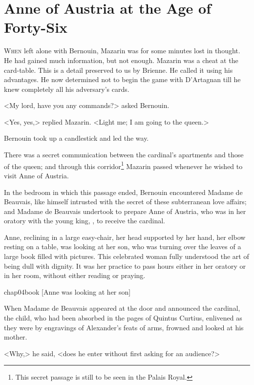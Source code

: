 \chapter{Anne of Austria at the Age of Forty-Six}

 \lettrine{W}{hen} left alone with Bernouin, Mazarin was for some minutes lost in thought. He had gained much information, but not enough. Mazarin was a cheat at the card-table. This is a detail preserved to us by Brienne. He called it using his advantages. He now determined not to begin the game with D'Artagnan till he knew completely all his adversary's cards.

<My lord, have you any commands?> asked Bernouin.

<Yes, yes,> replied Mazarin. <Light me; I am going to the queen.>

Bernouin took up a candlestick and led the way.

There was a secret communication between the cardinal's apartments and those of the queen; and through this corridor\footnote{This secret passage is still to be seen in the Palais Royal.} Mazarin passed whenever he wished to visit Anne of Austria. 

In the bedroom in which this passage ended, Bernouin encountered Madame de Beauvais, like himself intrusted with the secret of these subterranean love affairs; and Madame de Beauvais undertook to prepare Anne of Austria, who was in her oratory with the young king, , to receive the cardinal.

Anne, reclining in a large easy-chair, her head supported by her hand, her elbow resting on a table, was looking at her son, who was turning over the leaves of a large book filled with pictures. This celebrated woman fully understood the art of being dull with dignity. It was her practice to pass hours either in her oratory or in her room, without either reading or praying.

\begin{bwbigpic}
	[\basicscale] 
	{chap04book}
	[Anne was looking at her son]
\end{bwbigpic}

When Madame de Beauvais appeared at the door and announced the cardinal, the child, who had been absorbed in the pages of Quintus Curtius, enlivened as they were by engravings of Alexander's feats of arms, frowned and looked at his mother.

<Why,> he said, <does he enter without first asking for an audience?>

